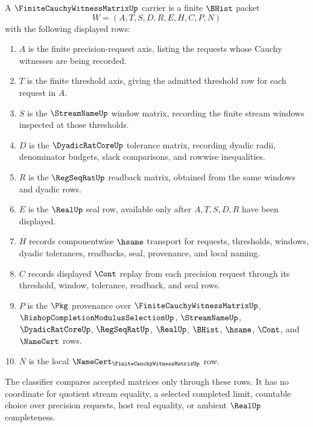 \begin{definition}
\label{def:finite-cauchy-witness-matrix-carrier}
A $\FiniteCauchyWitnessMatrixUp$ carrier is a finite $\BHist$ packet
$$
W=(A,T,S,D,R,E,H,C,P,N)
$$
with the following displayed rows:
\begin{enumerate}
\item $A$ is the finite precision-request axis, listing the requests whose Cauchy witnesses are being recorded.
\item $T$ is the finite threshold axis, giving the admitted threshold row for each request in $A$.
\item $S$ is the $\StreamNameUp$ window matrix, recording the finite stream windows inspected at those thresholds.
\item $D$ is the $\DyadicRatCoreUp$ tolerance matrix, recording dyadic radii, denominator budgets, slack comparisons, and rowwise inequalities.
\item $R$ is the $\RegSeqRatUp$ readback matrix, obtained from the same windows and dyadic rows.
\item $E$ is the $\RealUp$ seal row, available only after $A,T,S,D,R$ have been displayed.
\item $H$ records componentwise $\hsame$ transport for requests, thresholds, windows, dyadic tolerances, readbacks, seal, provenance, and local naming.
\item $C$ records displayed $\Cont$ replay from each precision request through its threshold, window, tolerance, readback, and seal rows.
\item $P$ is the $\Pkg$ provenance over $\FiniteCauchyWitnessMatrixUp$, $\BishopCompletionModulusSelectionUp$, $\StreamNameUp$, $\DyadicRatCoreUp$, $\RegSeqRatUp$, $\RealUp$, $\BHist$, $\hsame$, $\Cont$, and $\NameCert$ rows.
\item $N$ is the local $\NameCert_{\FiniteCauchyWitnessMatrixUp}$ row.
\end{enumerate}
The classifier compares accepted matrices only through these rows. It has no coordinate for quotient stream equality, a selected completed limit, countable choice over precision requests, host real equality, or ambient $\RealUp$ completeness.
\end{definition}

